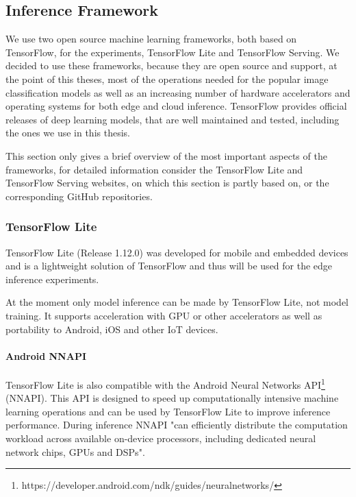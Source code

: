 \subsection{Inference Framework}
We use two open source machine learning frameworks, both based on TensorFlow, for the experiments, TensorFlow Lite and TensorFlow Serving. We decided to use these frameworks, because they are open source and support, at the point of this theses, most of the operations needed for the popular image classification models as well as an increasing number of hardware accelerators and operating systems for both edge and cloud inference.
TensorFlow provides official releases of deep learning models, that are well maintained and tested, including the ones we use in this thesis.

This section only gives a brief overview of the most important aspects of the frameworks, for detailed information consider the TensorFlow Lite\cite{tfLite}  and TensorFlow Serving\cite{tfServing} websites, on which this section is partly based on, or the corresponding GitHub repositories.
\subsubsection{TensorFlow Lite}
\label{chap:TFLite}
TensorFlow Lite (Release 1.12.0) was developed for mobile and embedded devices and is a lightweight solution of TensorFlow and thus will be used for the edge inference experiments.

At the moment only model inference can be made by TensorFlow Lite, not model training.
It supports acceleration with GPU or other accelerators as well as portability to Android, iOS and other IoT devices.

\paragraph{Android NNAPI}
\label{chap:NNAPI}
TensorFlow Lite is also compatible with the Android Neural Networks API\footnote{https://developer.android.com/ndk/guides/neuralnetworks/} (NNAPI). This API
is designed to speed up computationally intensive machine learning operations and can be used by TensorFlow Lite to improve inference performance. During inference NNAPI "can
efficiently distribute the computation workload across available on-device processors, including dedicated neural network chips, GPUs and DSPs"\cite{DBLP:journals/corr/abs-1810-01109}.

